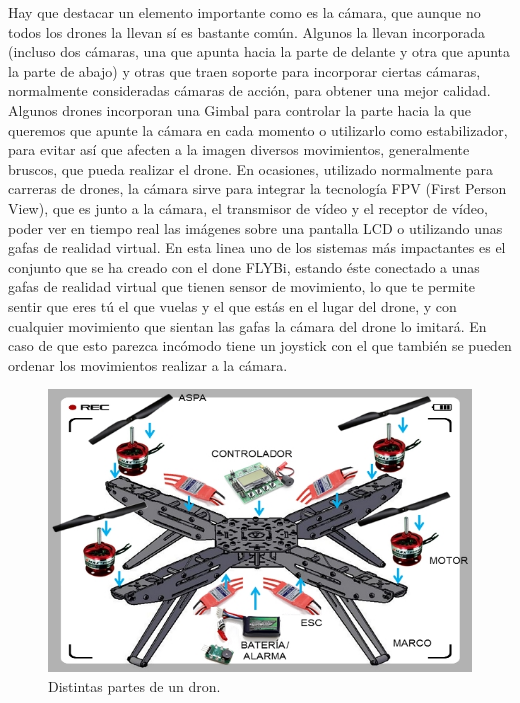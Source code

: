 Hay que destacar un elemento importante como es la cámara, que aunque no
todos los drones la llevan sí es bastante común. Algunos la llevan incorporada (incluso
dos cámaras, una que apunta hacia la parte de delante y otra que apunta la parte
de abajo) y otras que traen soporte para incorporar ciertas cámaras, normalmente
consideradas cámaras de acción, para obtener una mejor calidad. Algunos drones
incorporan una Gimbal para controlar la parte hacia la que queremos que apunte la
cámara en cada momento o utilizarlo como estabilizador, para evitar así que afecten a
la imagen diversos movimientos, generalmente bruscos, que pueda realizar el drone.
En ocasiones, utilizado normalmente para carreras de drones, la cámara sirve
para integrar la tecnología FPV (First Person View), que es junto a la cámara, el
transmisor de vídeo y el receptor de vídeo, poder ver en tiempo real las imágenes sobre
una pantalla LCD o utilizando unas gafas de realidad virtual. En esta linea uno de los
sistemas más impactantes es el conjunto que se ha creado con el done FLYBi, estando
éste conectado a unas gafas de realidad virtual que tienen sensor de movimiento, lo que
te permite sentir que eres tú el que vuelas y el que estás en el lugar del drone, y con
cualquier movimiento que sientan las gafas la cámara del drone lo imitará. En caso de
que esto parezca incómodo tiene un joystick con el que también se pueden ordenar los
movimientos realizar a la cámara.

\begin{figure}[H]
  \centering
  \includegraphics[scale=0.8]{imagenes/partesdron.jpg}
  \caption{Distintas partes de un dron.}
  \label{fig:gnat}
\end{figure}

